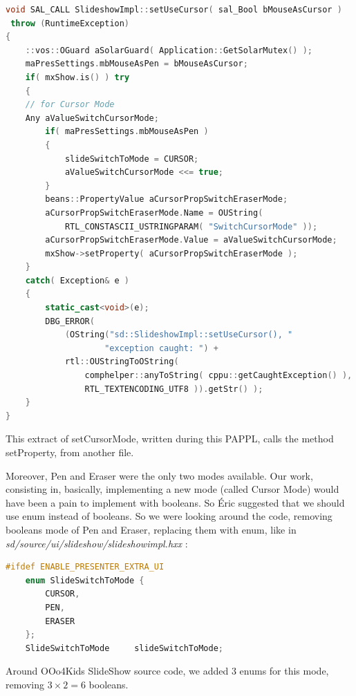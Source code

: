 \documentclass[a4paper,11pt]{article}
\begin{document}
\begin{lstlisting}[language=C++]
void SAL_CALL SlideshowImpl::setUseCursor( sal_Bool bMouseAsCursor )
 throw (RuntimeException)
{
    ::vos::OGuard aSolarGuard( Application::GetSolarMutex() );
    maPresSettings.mbMouseAsPen = bMouseAsCursor;
    if( mxShow.is() ) try
    {
    // for Cursor Mode
    Any aValueSwitchCursorMode;
        if( maPresSettings.mbMouseAsPen )
        {
            slideSwitchToMode = CURSOR;
            aValueSwitchCursorMode <<= true;
        }
        beans::PropertyValue aCursorPropSwitchEraserMode;
        aCursorPropSwitchEraserMode.Name = OUString( 
        	RTL_CONSTASCII_USTRINGPARAM( "SwitchCursorMode" ));
        aCursorPropSwitchEraserMode.Value = aValueSwitchCursorMode;
        mxShow->setProperty( aCursorPropSwitchEraserMode );
    }
    catch( Exception& e )
    {
        static_cast<void>(e);
        DBG_ERROR(
            (OString("sd::SlideshowImpl::setUseCursor(), "
                    "exception caught: ") +
            rtl::OUStringToOString(
                comphelper::anyToString( cppu::getCaughtException() ),
                RTL_TEXTENCODING_UTF8 )).getStr() );
    }
}
\end{lstlisting}
This extract of setCursorMode, written during this PAPPL, calls the method setProperty, from another file.%

Moreover, Pen and Eraser were the only two modes available. Our work, consisting in, basically, implementing a new mode (called Cursor Mode) would have been a pain to implement with booleans. So Éric suggested that we should use enum instead of booleans. So we were looking around the code, removing booleans mode of Pen and Eraser, replacing them with enum, like in \emph{sd/source/ui/slideshow/slideshowimpl.hxx} :

\begin{lstlisting}[language=C++]
#ifdef ENABLE_PRESENTER_EXTRA_UI
    enum SlideSwitchToMode {
        CURSOR,
        PEN,
        ERASER
    };
    SlideSwitchToMode     slideSwitchToMode;
\end{lstlisting}

Around OOo4Kids SlideShow source code, we added 3 enums for this mode, removing $3\times 2 = 6$ booleans.
\end{document}
